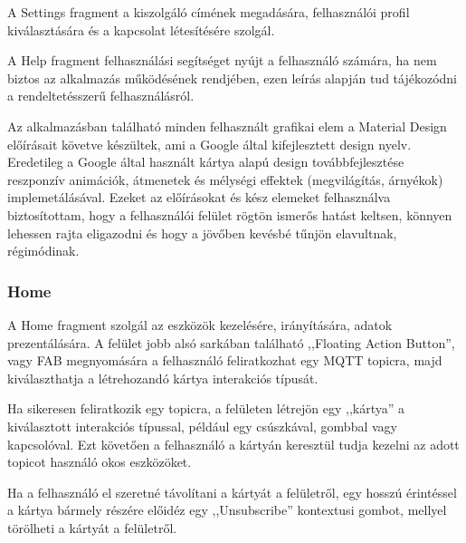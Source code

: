 \documentclass[
]{thesis-ekf}
\theoremstyle{definition}
\theoremstyle{remark}
\begin{document}
A Settings fragment a kiszolgáló címének megadására, felhasználói profil kiválasztására és a kapcsolat létesítésére
szolgál.

A Help fragment felhasználási segítséget nyújt a felhasználó számára, ha nem biztos az alkalmazás működésének rendjében,
ezen leírás alapján tud tájékozódni a rendeltetésszerű felhasználásról.

Az alkalmazásban található minden felhasznált grafikai elem a Material Design\cite{material} előírásait követve készültek,
ami a Google által kifejlesztett design nyelv. Eredetileg a Google által használt kártya alapú design továbbfejlesztése
reszponzív animációk, átmenetek és mélységi effektek (megvilágítás, árnyékok) implemetálásával. Ezeket az előírásokat és
kész elemeket felhasználva biztosítottam, hogy a felhasználói felület rögtön ismerős hatást keltsen, könnyen lehessen rajta
eligazodni és hogy a jövőben kevésbé tűnjön elavultnak, régimódinak.


\subsubsection{Home}
A Home fragment szolgál az eszközök kezelésére, irányítására, adatok prezentálására.
A felület jobb alsó sarkában található ,,Floating Action Button'', vagy FAB megnyomására a felhasználó feliratkozhat egy MQTT
topicra, majd kiválaszthatja a létrehozandó kártya interakciós típusát. 

Ha sikeresen feliratkozik egy topicra, a felületen létrejön
egy ,,kártya'' a kiválasztott interakciós típussal, például egy csúszkával, gombbal vagy kapcsolóval. Ezt követően a felhasználó a
kártyán keresztül tudja kezelni az adott topicot használó okos eszközöket. 

Ha a felhasználó el szeretné távolítani a kártyát a felületről,
egy hosszú érintéssel a kártya bármely részére előidéz egy ,,Unsubscribe'' kontextusi gombot, mellyel törölheti a kártyát a felületről.
\end{document}
